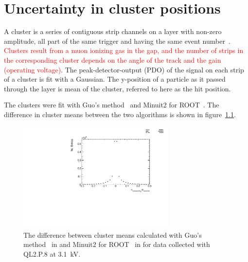 

\chapter[Cluster position uncertainty]{Uncertainty in cluster positions}
\label{appendix:clustering}


A cluster is a series of contiguous strip channels on a layer with non-zero amplitude, all part of the same trigger and having the same event number~\cite{lefebvre_thesis}. \textcolor{red}{Clusters result from a muon ionizing gas in the gap, and the number of strips in the corresponding cluster depends on the angle of the track and the gain (operating voltage)}. The peak-detector-output (PDO) of the signal on each strip of a cluster is fit with a Gaussian. The y-position of a particle as it passed through the layer is mean of the cluster, referred to here as the hit position.

The clusters were fit with Guo's method~\cite{guo_simple_2011} and Minuit2 for ROOT~\cite{hatlo_developments_2005}. The difference in cluster means between the two algorithms is shown in figure~\ref{fig:mu_reclustering_minus_mu_cosmics}.

\begin{figure}
    \centering
    \includegraphics[width = 0.7\textwidth]{figures/figure_QL2P08_3100V_2021-05-21_reclustering_plots_mu_reclustering_minus_mu_cosmics.pdf}
    \caption{The difference between cluster means calculated with Guo's method~\cite{guo_simple_2011} in  and Minuit2 for ROOT~\cite{hatlo_developments_2005} in  for data collected with QL2.P.8 at 3.1~kV.}
    \label{fig:mu_reclustering_minus_mu_cosmics}
\end{figure}

